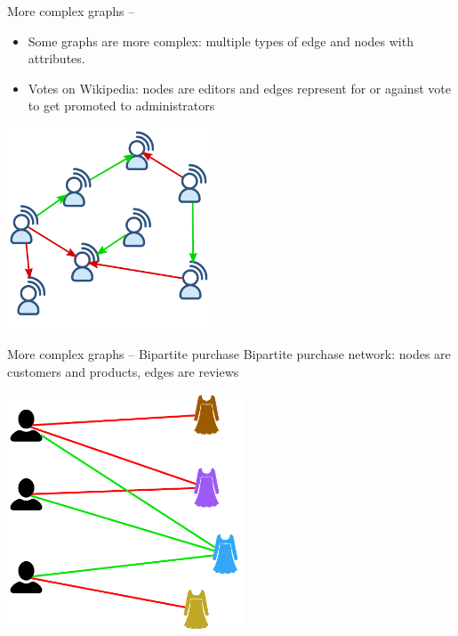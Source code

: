 \documentclass[10pt,svgnames,ignorenonframetext,final]{beamer}
\providecommand{\tightlist}{%
  \setlength{\itemsep}{0pt}\setlength{\parskip}{0pt}}
\begin{document}
\begin{frame}{More complex graphs -- \wik{}}
  \begin{itemize}
    \tightlist
    \item Some graphs are more \alert{complex}: multiple types of edge and nodes with attributes.
    \item Votes on Wikipedia: nodes are editors and edges represent for or against vote to get
      promoted to administrators
\end{itemize}


  \begin{center}
  \includegraphics[height=6cm]{wiki.pdf}
  \end{center}
\end{frame}
\begin{frame}{More complex graphs -- Bipartite purchase}
  Bipartite purchase network: nodes are customers and products, edges
  are reviews

  \begin{center}
  \includegraphics[height=7cm]{bipartite.pdf}
  \end{center}
\end{frame}
\end{document}
